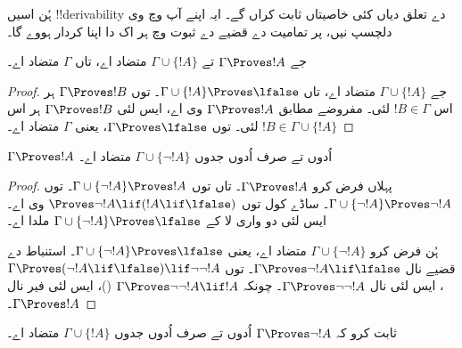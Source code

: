 \documentclass[../../../include/open-logic-section]{subfiles}
\begin{document}
      {}
      {}


ہُن اسیں !!{derivability} دے تعلق دیاں کئی خاصیتاں ثابت کراں گے۔
ایہ اپنے آپ وچ وی دلچسپ نیں، پر تمامیت دے قضیے دے ثبوت وچ
ہر اک دا اپنا کردار ہووے گا۔

\begin{prop}
  جے $\Gamma \Proves !A$ تے $\Gamma \cup \{!A\}$ متضاد اے،
  تاں $\Gamma$ متضاد اے۔
\end{prop}

\begin{proof}
  جے $\Gamma \cup \{!A\}$ متضاد اے، تاں $\Gamma \cup \{!A\}
  \Proves \lfalse$۔  توں
  $\Gamma \Proves !B$ ہر اس $!B \in \Gamma$ لئی۔ مفروضے مطابق
  $\Gamma \Proves !A$ وی اے، ایس لئی $\Gamma \Proves !B$
  ہر اس $!B \in \Gamma \cup
  \{!A\}$ لئی۔ 
  توں $\Gamma \Proves
  \lfalse$، یعنی $\Gamma$ متضاد اے۔
\end{proof}

\begin{prop}
$\Gamma \Proves !A$ اُدوں تے صرف اُدوں جدوں $\Gamma \cup \{\lnot !A\}$ متضاد اے۔
\end{prop}

\begin{proof}
پہلاں فرض کرو $\Gamma \Proves !A$۔ تاں 
توں $\Gamma \cup \{\lnot !A\}
\Proves !A$۔  توں $\Gamma \cup \{\lnot
!A\} \Proves \lnot !A$۔ ساڈے کول  توں
$\Proves \lnot !A \lif (!A \lif \lfalse)$ وی اے۔ ایس لئی
 دو واری لا کے $\Gamma \cup \{\lnot
!A\} \Proves \lfalse$ ملدا اے۔

ہُن فرض کرو $\Gamma \cup \{\lnot !A\}$ متضاد اے، یعنی $\Gamma
\cup \{\lnot !A\} \Proves \lfalse$۔ استنباط دے قضیے نال $\Gamma
\Proves \lnot !A \lif \lfalse$۔  توں $\Gamma
\Proves (\lnot !A \lif
\lfalse) \lif \lnot\lnot !A$، ایس لئی  نال $\Gamma
\Proves \lnot\lnot !A$۔ چونکہ $\Gamma \Proves
\lnot\lnot !A \lif !A$ ()، ایس لئی فیر
 نال $\Gamma
\Proves !A$۔
\end{proof}

\begin{prob}
ثابت کرو کہ $\Gamma \Proves \lnot !A$ اُدوں تے صرف اُدوں جدوں
$\Gamma \cup \{!A\}$ متضاد اے۔
\end{prob}
\end{document}
